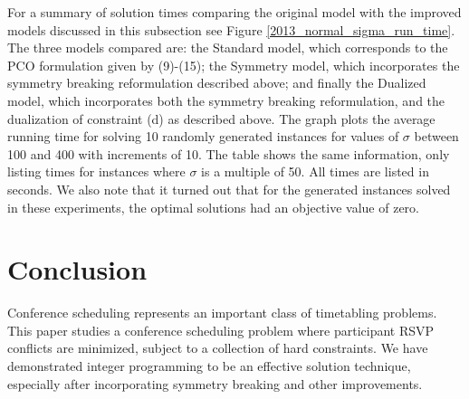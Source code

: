 \documentclass{svjour3}                     %
\begin{document}
For a summary of solution times comparing the original model with the improved models discussed in this subsection see Figure \ref{2013_normal_sigma_run_time}. 
The three models compared are: the Standard model, which corresponds to the PCO formulation given by (9)-(15); the Symmetry model, which incorporates the symmetry breaking reformulation described above; and finally the Dualized model, which incorporates both the symmetry breaking reformulation, and the dualization of constraint (d) as described above.
The graph plots the average running time for solving 10 randomly generated instances for values of $\sigma$ between 100 and 400 with increments of 10. 
The table shows the same information, only listing times for instances where $\sigma$ is a multiple of 50.
All times are listed in seconds.
We also note that it turned out that for the generated instances solved in these experiments, the optimal solutions had an objective value of zero.


\section{Conclusion}\label{sec.conclusion}
Conference scheduling represents an important class of timetabling problems.
This paper studies a conference scheduling problem where participant RSVP conflicts are minimized, subject to a collection of hard constraints.
We have demonstrated integer programming to be an effective solution technique, especially after incorporating symmetry breaking and other improvements.
	
\end{document}
